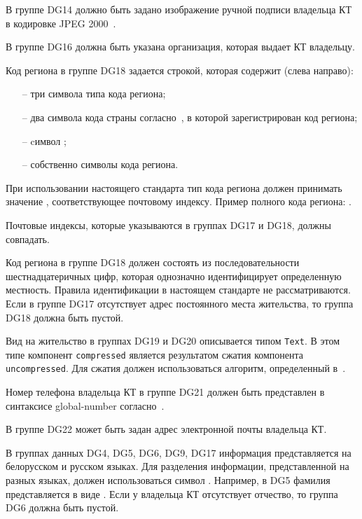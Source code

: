 
В группе DG14 должно быть задано изображение ручной подписи
владельца КТ в кодировке JPEG 2000~\cite{JPEG2000}.

В группе DG16 должна быть указана организация, которая выдает КТ владельцу. 

Код региона в группе DG18 задается строкой, которая содержит
(слева направо):
\begin{itemize}
\item[--]
три символа типа кода региона;
\item[--]
два символа кода страны согласно~\cite{CountryCodes}, 
в которой зарегистрирован код региона;
\item[--]
cимвол \str{-}; 
\item[--]
собственно символы кода региона.
\end{itemize}

При использовании настоящего стандарта тип кода региона
должен принимать значение , соответствующее
почтовому индексу. Пример полного кода региона: .

Почтовые индексы, которые указываются в группах DG17 и DG18,
должны совпадать.

Код региона в группе DG18 должен состоять из последовательности 
шестнадцатеричных цифр, которая однозначно идентифицирует определенную 
местность. Правила идентификации в настоящем стандарте не рассматриваются. 
Если в группе DG17 отсутствует адрес постоянного места жительства, то 
группа DG18 должна быть пустой. 
\fi


Вид на жительство в группах DG19 и DG20 описывается типом \verb|Text|. 
В этом типе компонент \verb|compressed| является результатом сжатия компонента 
\verb|uncompressed|. Для сжатия должен использоваться алгоритм, 
определенный в~\cite{DEFLATE}. 
\fi

Номер телефона владельца КТ в группе DG21 должен быть
представлен в синтаксисе global-number согласно~\cite{RFC3966}. 

В группе DG22 может быть задан адрес электронной почты владельца КТ. 

В группах данных DG4, DG5, DG6, DG9, DG17 информация
представляется на белорусском и русском языках.
Для разделения информации, представленной на разных языках,
должен использоваться символ \str{/}. Например, в DG5 фамилия 
представляется в виде .
Если у владельца КТ отсутствует отчество, то группа DG6 должна быть пустой. 

